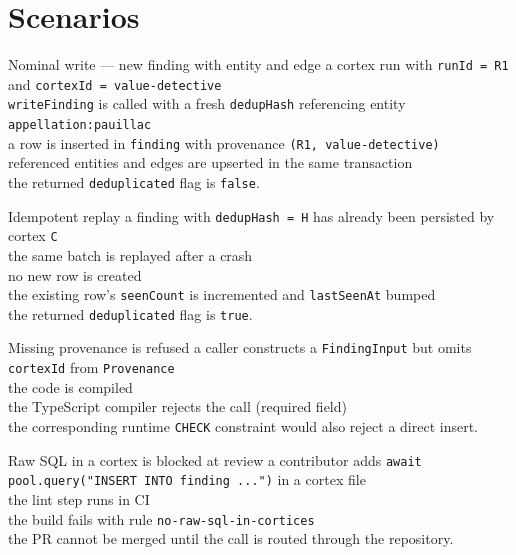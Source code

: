 \section{Scenarios}

\begin{scenario}{Nominal write --- new finding with entity and edge}
\Given a cortex run with \texttt{runId = R1} and \texttt{cortexId = value-detective} \\
\When \texttt{writeFinding} is called with a fresh \texttt{dedupHash} referencing entity
\texttt{appellation:pauillac} \\
\Then a row is inserted in \texttt{finding} with provenance \texttt{(R1, value-detective)} \\
\And referenced entities and edges are upserted in the same transaction \\
\And the returned \texttt{deduplicated} flag is \texttt{false}.
\end{scenario}

\begin{scenario}{Idempotent replay}
\Given a finding with \texttt{dedupHash = H} has already been persisted by cortex \texttt{C} \\
\When the same batch is replayed after a crash \\
\Then no new row is created \\
\And the existing row's \texttt{seenCount} is incremented and \texttt{lastSeenAt} bumped \\
\And the returned \texttt{deduplicated} flag is \texttt{true}.
\end{scenario}

\begin{scenario}{Missing provenance is refused}
\Given a caller constructs a \texttt{FindingInput} but omits \texttt{cortexId} from \texttt{Provenance} \\
\When the code is compiled \\
\Then the TypeScript compiler rejects the call (required field) \\
\And the corresponding runtime \texttt{CHECK} constraint would also reject a direct insert.
\end{scenario}

\begin{scenario}{Raw SQL in a cortex is blocked at review}
\Given a contributor adds \texttt{await pool.query("INSERT INTO finding ...")} in a cortex file \\
\When the lint step runs in CI \\
\Then the build fails with rule \texttt{no-raw-sql-in-cortices} \\
\And the PR cannot be merged until the call is routed through the repository.
\end{scenario}

